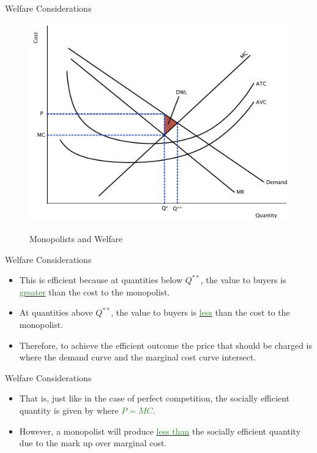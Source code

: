 \documentclass[xcolor={dvipsnames},pdf, hyperref={colorlinks=true, citecolor=ForestGreen, linkcolor=BlueViolet, urlcolor=Magenta}]{beamer}
\newcommand{\ddp}[1]{{\textcolor{ForestGreen}{#1}}}
\newcommand{\dd}[1]{{\underline{\textcolor{ForestGreen}{#1}}}}
\begin{document}
\begin{frame}[b]{Welfare Considerations}
	\begin{figure}[H]
	\centering
	\ddp{\includegraphics[scale=.35]{plot76.pdf}}
	\caption{Monopolists and Welfare}
\end{figure}
\end{frame}

\begin{frame}{Welfare Considerations}
\begin{itemize}
	\item 	This is efficient because at quantities below $Q^{**}$, the value to buyers is \dd{greater} than the cost to the monopolist. 
	\item At quantities above $Q^{**}$, the value to buyers is \dd{less} than the cost to the monopolist.
	\item Therefore, to achieve the efficient outcome the price that should be charged is where the demand curve and the marginal cost curve intersect. 
\end{itemize}
\end{frame}

\begin{frame}{Welfare Considerations}
	\begin{itemize}
	
		\item That is, just like in the case of perfect competition, the socially efficient quantity is given by where \dd{$P = MC$}. 
		\item However, a monopolist will produce \dd{less than} the socially efficient quantity due to the mark up over marginal cost.
	\end{itemize}
\end{frame}
\end{document}

